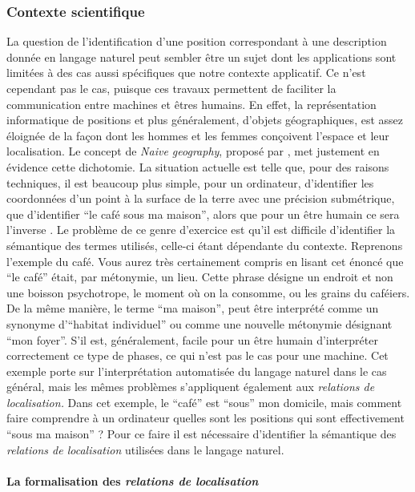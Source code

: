 \subsubsection{Contexte scientifique}

La question de l’identification d'une position correspondant à une
description donnée en langage naturel peut sembler être un sujet dont
les applications sont limitées à des cas aussi spécifiques que notre
contexte applicatif. Ce n'est cependant pas le cas, puisque ces
travaux permettent de faciliter la communication entre machines et
êtres humains. En effet, la représentation informatique de positions
et plus généralement, d'objets géographiques, est assez éloignée de la
façon dont les hommes et les femmes conçoivent l'espace et leur
localisation.  Le concept de \emph{Naive geography}, proposé par
\textcite{Egenhofer1995}, met justement en évidence cette dichotomie.
%
La situation actuelle est telle que, pour des raisons techniques, il
est beaucoup plus simple, pour un ordinateur, d'identifier les
coordonnées d'un point à la surface de la terre avec une précision
submétrique, que d'identifier \enquote{le café sous ma maison}, alors
que pour un être humain ce sera l'inverse \autocite{Duchene2019}. Le
problème de ce genre d'exercice est qu'il est difficile d'identifier
la sémantique des termes utilisés, celle-ci étant dépendante du
contexte. Reprenons l'exemple du café. Vous aurez très certainement
compris en lisant cet énoncé que \enquote{le café} était, par
métonymie, un lieu. Cette phrase désigne un endroit et non une boisson
psychotrope, le moment où on la consomme, ou les grains du
caféiers. De la même manière, le terme \enquote{ma maison}, peut être
interprété comme un synonyme d'\enquote{habitat individuel} ou comme
une nouvelle métonymie désignant \enquote{mon foyer}. S'il est,
généralement, facile pour un être humain d'interpréter correctement ce
type de phases, ce qui n'est pas le cas pour une machine.
%
Cet exemple porte sur l'interprétation automatisée du langage naturel
dans le cas général, mais les mêmes problèmes s'appliquent également
aux \emph{relations de localisation.} Dans cet exemple, le
\enquote{café} est \enquote{sous} mon domicile, mais comment faire
comprendre à un ordinateur quelles sont les positions qui sont
effectivement \enquote{sous ma maison} ? Pour ce faire il est
nécessaire d'identifier la sémantique des \emph{relations de
  localisation} utilisées dans le langage naturel.

\paragraph{La formalisation des \emph{relations de localisation}}

